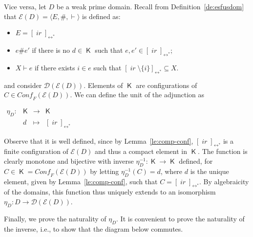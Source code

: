 \documentclass[conference]{IEEEtran}
\renewenvironment{proof}{\begin{IEEEproof}}{\end{IEEEproof}}
\newcommand{\compact}[1]{\ensuremath{\mathop{\mathsf{K}({#1})}}}
\newcommand{\ir}[1]{\ensuremath{\mathop{\mathit{ir}({#1})}}}
\newcommand{\eqclass}[2][]{\ensuremath{[{#2}]_{\scriptscriptstyle {#1}}}}
\newcommand{\eqclassir}[1]{\ensuremath{\eqclass[\leftrightarrow^*]{#1}}}
\newcommand{\zev}[0]{\ensuremath{\mathcal{E}}}
\newcommand{\ev}[1]{\ensuremath{\zev({#1})}}
\newcommand{\conff}[1]{\ensuremath{\mathit{Conf_F}({#1})}}
\newcommand{\zdom}[0]{\ensuremath{\mathcal{D}}}
\newcommand{\dom}[1]{\ensuremath{\zdom({#1})}}
\begin{document}
\begin{proof}
  \bigskip

  Vice versa, let $D$ be a weak prime domain. Recall from Definition~\ref{de:esfusdom} that 
  $\ev{D} = \langle E, \#, \vdash \rangle$ is defined as:
  \begin{itemize}
  \item $E =  \eqclassir{\ir{D}}$
  \item $e \# e'$ if there is no $d \in \compact{D}$ such that
    $e, e' \in \eqclassir{\ir{d}}$;
  \item $X \vdash e$ if there exists $i \in e$ such that
    $\eqclassir{\ir{i} \setminus \{ i \}} \subseteq X$.
  \end{itemize}
  and consider $\dom{\ev{D}}$.  Elements of $\compact{\dom{\ev{D}}}$
  are configurations of $C \in \conff{\ev{D}}$.  
  We can define the {unit} of the adjunction as
  \begin{center}
    $\begin{array}{lccc}
       \eta_{D} : & \compact{D} &  \to & \compact{\dom{\ev{D}}}\\
                  & d & \mapsto & \eqclassir{\ir{d}}
     \end{array}
     $
  \end{center}
  Observe that it is well defined, since by Lemma~\ref{le:comp-conf},
  $\eqclassir{\ir{d}}$ is a finite configuration of $\ev{D}$ and thus
  a compact element in $\compact{\dom{\ev{D}}}$.  The function is
  clearly monotone and bijective with inverse
  $\eta_D^{-1} : \compact{\dom{\ev{D}}} \to \compact{D}$ defined, for
  $C \in \compact{\dom{\ev{D}}} = \conff{\ev{D}}$ by letting
  $\eta_D^{-1}(C) = d$, where $d$ is the unique element, given by
  Lemma~\ref{le:comp-conf}, such that $C = \eqclassir{\ir{d}}$.
  By
  algebraicity of the domains, this function thus uniquely extends to
  an isomorphism $\eta_D : D \to \dom{\ev{D}}$.

  Finally, we prove the naturality of $\eta_D$. It is convenient to
  prove the naturality of the inverse, i.e., to show that the diagram
  below commutes.
  \begin{center}
  \end{center}
  

\end{proof}
\end{document}
